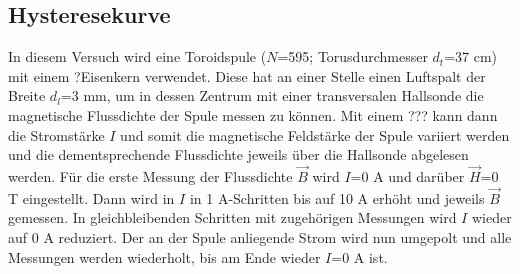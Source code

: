     \subsection{Hysteresekurve}

        In diesem Versuch wird eine Toroidspule ($N$=595; Torusdurchmesser $d_t$=37 \si{\centi\meter}) mit einem ?Eisenkern
        verwendet. Diese hat an einer Stelle einen Luftspalt der Breite $d_l$=3 \si{\milli\meter}, um in 
        dessen Zentrum mit einer transversalen Hallsonde die magnetische Flussdichte der Spule messen zu können.
        Mit einem ??? kann dann die Stromstärke $I$ und somit die  magnetische Feldstärke der Spule 
        variiert werden und die dementsprechende Flussdichte jeweils über die Hallsonde abgelesen werden.
        Für die erste Messung der Flussdichte $\vec B$ wird $I$=0 \si{\ampere} und darüber $\vec H$=0 \si{\tesla}
        eingestellt. Dann wird in  $I$ in 1 \si{\ampere}-Schritten bis auf 10 \si{\ampere} erhöht und jeweils $\vec B$
        gemessen. In gleichbleibenden Schritten mit zugehörigen Messungen wird $I$ wieder auf 0 \si{\ampere}
        reduziert. Der an der Spule anliegende Strom wird nun umgepolt und alle Messungen werden
        wiederholt, bis am Ende wieder $I$=0 \si{\ampere} ist.

        
        

        

        


